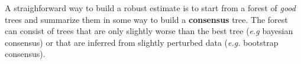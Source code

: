 A straighforward way to build a robust estimate is to start from a forest of \emph{good} trees and summarize them in some way to build a \textbf{consensus} tree. The forest can consist of trees that are only slightly worse than the best tree (\emph{e.g} bayesian consensus) or that are inferred from slightly perturbed data (\emph{e.g.} bootstrap consensus). 
